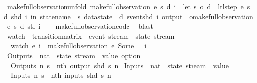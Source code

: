 \begin{isabellebody}
\isanewline
{}\isamarkupfalse%
\ make{\isacharunderscore}full{\isacharunderscore}observation{\isacharunderscore}unfold{\isacharcolon}\ {\isachardoublequoteopen}make{\isacharunderscore}full{\isacharunderscore}observation\ e\ s\ d\ i\ {\isacharequal}\ {\isacharparenleft}let\ {\isacharparenleft}s{\isacharprime}{\isacharcomma}\ o{\isacharprime}{\isacharcomma}\ d{\isacharprime}{\isacharparenright}\ {\isacharequal}\ ltl{\isacharunderscore}step\ e\ s\ d\ {\isacharparenleft}shd\ i{\isacharparenright}\ in\ {\isasymlparr}statename\ {\isacharequal}\ s{\isacharcomma}\ datastate\ {\isacharequal}\ d{\isacharcomma}\ event{\isacharequal}{\isacharparenleft}shd\ i{\isacharparenright}{\isacharcomma}\ output\ {\isacharequal}\ o{\isacharprime}{\isasymrparr}{\isacharhash}{\isacharhash}{\isacharparenleft}make{\isacharunderscore}full{\isacharunderscore}observation\ e\ s{\isacharprime}\ d{\isacharprime}\ {\isacharparenleft}stl\ i{\isacharparenright}{\isacharparenright}{\isacharparenright}{\isachardoublequoteclose}\isanewline
%
\isadelimproof
\ \ %
\endisadelimproof
%
\isatagproof
{}\isamarkupfalse%
\ make{\isacharunderscore}full{\isacharunderscore}observation{\isachardot}code\ \isamarkupfalse%
\ blast%
\endisatagproof
{\isafoldproof}%
%
\isadelimproof
\isanewline
%
\endisadelimproof
\isanewline
{}\isamarkupfalse%
\ watch\ {\isacharcolon}{\isacharcolon}\ {\isachardoublequoteopen}transition{\isacharunderscore}matrix\ {\isasymRightarrow}\ event\ stream\ {\isasymRightarrow}\ state\ stream{\isachardoublequoteclose}\ \isanewline
\ \ {\isachardoublequoteopen}watch\ e\ i\ {\isasymequiv}\ {\isacharparenleft}make{\isacharunderscore}full{\isacharunderscore}observation\ e\ {\isacharparenleft}Some\ {}{\isacharparenright}\ {\isacharless}{\isachargreater}\ i{\isacharparenright}{\isachardoublequoteclose}\isanewline
\isanewline
{}\isamarkupfalse%
\ Outputs\ {\isacharcolon}{\isacharcolon}\ {\isachardoublequoteopen}nat\ {\isasymRightarrow}\ state\ stream\ {\isasymRightarrow}\ value\ option{\isachardoublequoteclose}\ \isanewline
\ \ {\isachardoublequoteopen}Outputs\ n\ s\ {\isasymequiv}\ nth\ {\isacharparenleft}output\ {\isacharparenleft}shd\ s{\isacharparenright}{\isacharparenright}\ n{\isachardoublequoteclose}\isanewline
\isanewline
{}\isamarkupfalse%
\ Inputs\ {\isacharcolon}{\isacharcolon}\ {\isachardoublequoteopen}nat\ {\isasymRightarrow}\ state\ stream\ {\isasymRightarrow}\ value{\isachardoublequoteclose}\ \isanewline
\ \ {\isachardoublequoteopen}Inputs\ n\ s\ {\isasymequiv}\ nth\ {\isacharparenleft}inputs\ {\isacharparenleft}shd\ s{\isacharparenright}{\isacharparenright}\ {\isacharparenleft}n{\isacharminus}{}{\isacharparenright}{\isachardoublequoteclose}\isanewline

\end{isabellebody}
